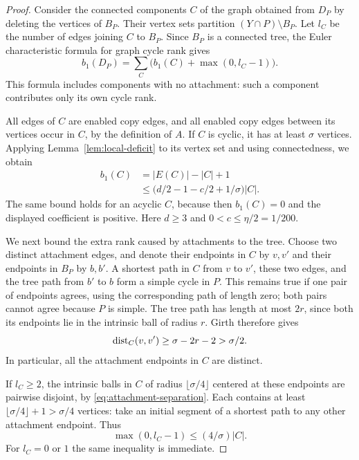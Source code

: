 \begin{proof}
Consider the connected components $C$ of the graph obtained from $D_P$
by deleting the vertices of $B_P$.  Their vertex sets partition
$(Y\cap P)\setminus B_P$.  Let $l_C$ be the number of edges joining
$C$ to $B_P$.  Since $B_P$ is a connected tree, the Euler characteristic
formula for graph cycle rank gives
\begin{equation}
 b_1(D_P)=\sum_C\bigl(b_1(C)+\max(0,l_C-1)\bigr).
 \label{eq:tree-attachment-rank}
\end{equation}
This formula includes components with no attachment: such a component
contributes only its own cycle rank.

All edges of $C$ are enabled copy edges, and all enabled copy edges
between its vertices occur in $C$, by the definition of $A$.
If $C$ is cyclic, it has at least $\sigma$ vertices.  Applying
Lemma~\ref{lem:local-deficit} to its vertex set and using connectedness,
we obtain
\begin{equation}
 \begin{split}
 b_1(C)&=|E(C)|-|C|+1\\
 &\le\bigl(d/2-1-c/2+1/\sigma\bigr)|C|.
 \end{split}
 \label{eq:exterior-cycle-rank}
\end{equation}
The same bound holds for an acyclic $C$, because then $b_1(C)=0$ and
the displayed coefficient is positive.  Here $d\ge3$ and
$0<c\le\eta/2=1/200$.

We next bound the extra rank caused by attachments to the tree.
Choose two distinct attachment edges, and denote their endpoints in
$C$ by $v,v'$ and their endpoints in $B_P$ by $b,b'$.  A shortest path
in $C$ from $v$ to $v'$, these two edges, and the tree path from $b'$ to
$b$ form a simple cycle in $P$.  This remains true if one pair of
endpoints agrees, using the corresponding path of length zero; both
pairs cannot agree because $P$ is simple.  The tree path has length at
most $2r$, since both its endpoints lie in the intrinsic ball of
radius $r$.  Girth therefore gives
\begin{equation}
 \operatorname{dist}_C(v,v')\ge\sigma-2r-2>\sigma/2.
 \label{eq:attachment-separation}
\end{equation}
In particular, all the attachment endpoints in $C$ are distinct.

If $l_C\ge2$, the intrinsic balls in $C$ of radius
$\lfloor\sigma/4\rfloor$ centered at these endpoints are pairwise
disjoint, by \eqref{eq:attachment-separation}.  Each contains at least
$\lfloor\sigma/4\rfloor+1>\sigma/4$ vertices: take an initial segment
of a shortest path to any other attachment endpoint.  Thus
\begin{equation}
 \max(0,l_C-1)\le(4/\sigma)|C|.
 \label{eq:attachment-packing}
\end{equation}
For $l_C=0$ or $1$ the same inequality is immediate.


\end{proof}
